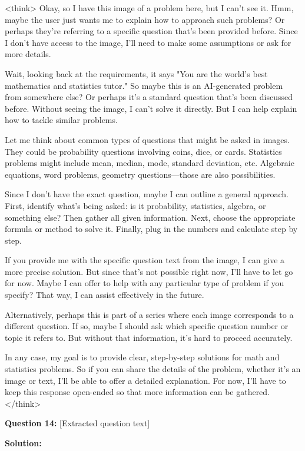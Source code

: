 <think>
Okay, so I have this image of a problem here, but I can't see it. Hmm, maybe the user just wants me to explain how to approach such problems? Or perhaps they're referring to a specific question that's been provided before. Since I don't have access to the image, I'll need to make some assumptions or ask for more details.

Wait, looking back at the requirements, it says "You are the world's best mathematics and statistics tutor." So maybe this is an AI-generated problem from somewhere else? Or perhaps it's a standard question that's been discussed before. Without seeing the image, I can't solve it directly. But I can help explain how to tackle similar problems.

Let me think about common types of questions that might be asked in images. They could be probability questions involving coins, dice, or cards. Statistics problems might include mean, median, mode, standard deviation, etc. Algebraic equations, word problems, geometry questions—those are also possibilities.

Since I don't have the exact question, maybe I can outline a general approach. First, identify what's being asked: is it probability, statistics, algebra, or something else? Then gather all given information. Next, choose the appropriate formula or method to solve it. Finally, plug in the numbers and calculate step by step.

If you provide me with the specific question text from the image, I can give a more precise solution. But since that's not possible right now, I'll have to let go for now. Maybe I can offer to help with any particular type of problem if you specify? That way, I can assist effectively in the future.

Alternatively, perhaps this is part of a series where each image corresponds to a different question. If so, maybe I should ask which specific question number or topic it refers to. But without that information, it's hard to proceed accurately.

In any case, my goal is to provide clear, step-by-step solutions for math and statistics problems. So if you can share the details of the problem, whether it's an image or text, I'll be able to offer a detailed explanation. For now, I'll have to keep this response open-ended so that more information can be gathered.
</think>

\textbf{Question 14:}  
[Extracted question text]

\textbf{Solution:}


